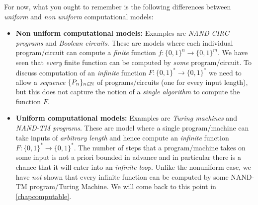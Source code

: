 For now, what you ought to remember is the following differences between
\emph{uniform} and \emph{non uniform} computational models:

\begin{itemize}
\item
  \textbf{Non uniform computational models:} Examples are
  \emph{NAND-CIRC programs} and \emph{Boolean circuits}. These are
  models where each individual program/circuit can compute a
  \emph{finite} function \(f:\{0,1\}^n \rightarrow \{0,1\}^m\). We have
  seen that \emph{every} finite function can be computed by \emph{some}
  program/circuit. To discuss computation of an \emph{infinite} function
  \(F:\{0,1\}^* \rightarrow \{0,1\}^*\) we need to allow a
  \emph{sequence} \(\{ P_n \}_{n\in {\mathbb{N}}}\) of programs/circuits (one for
  every input length), but this does not capture the notion of a
  \emph{single algorithm} to compute the function \(F\).
\item
  \textbf{Uniform computational models:} Examples are \emph{Turing
  machines} and \emph{NAND-TM programs}. These are model where a single
  program/machine can take inputs of \emph{arbitrary length} and hence
  compute an \emph{infinite} function
  \(F:\{0,1\}^* \rightarrow \{0,1\}^*\). The number of steps that a
  program/machine takes on some input is not a priori bounded in advance
  and in particular there is a chance that it will enter into an
  \emph{infinite loop}. Unlike the nonuniform case, we have \emph{not}
  shown that every infinite function can be computed by some NAND-TM
  program/Turing Machine. We will come back to this point in
  \cref{chapcomputable}.
\end{itemize}


